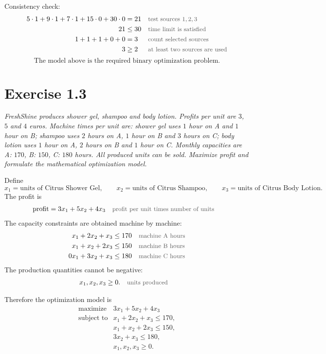 \documentclass[a4paper,11pt]{article}
\newif\ifexplain
\newcommand{\aufgabe}[1]{\section*{#1}}
\newcommand{\angabe}[1]{\textit{#1}\par\smallskip}
\newcommand{\why}[1]{\text{\small\color{black!65}#1}}
\newcommand{\explain}[1]{\ifexplain\begin{erklbox}#1\end{erklbox}\fi}
\begin{document}
Consistency check:
\begin{align*}
5\cdot1+9\cdot1+7\cdot1+15\cdot0+30\cdot0 &= 21 && \why{test sources $1,2,3$}\\
21&\le30 && \why{time limit is satisfied}\\
1+1+1+0+0&=3 && \why{count selected sources}\\
3&\ge2 && \why{at least two sources are used}
\end{align*}
\[
\boxed{\text{The model above is the required binary optimization problem.}}
\]

\aufgabe{Exercise 1.3}
\angabe{FreshShine produces shower gel, shampoo and body lotion. Profits per unit are $3$, $5$ and $4$ euros. Machine times per unit are: shower gel uses $1$ hour on A and $1$ hour on B; shampoo uses $2$ hours on A, $1$ hour on B and $3$ hours on C; body lotion uses $1$ hour on A, $2$ hours on B and $1$ hour on C. Monthly capacities are A: $170$, B: $150$, C: $180$ hours. All produced units can be sold. Maximize profit and formulate the mathematical optimization model.}
\explain{Hier dürfen Mengen kontinuierlich modelliert werden, weil die Aufgabe keine Ganzzahligkeit verlangt. Die Variablen zählen produzierte Einheiten der drei Produkte.}

Define
\[
x_1=\text{units of Citrus Shower Gel},\qquad
x_2=\text{units of Citrus Shampoo},\qquad
x_3=\text{units of Citrus Body Lotion}.
\]
The profit is
\begin{align*}
\text{profit} &= 3x_1+5x_2+4x_3 && \why{profit per unit times number of units}
\end{align*}
The capacity constraints are obtained machine by machine:
\begin{align*}
x_1+2x_2+x_3 &\le170 && \why{machine A hours}\\
x_1+x_2+2x_3 &\le150 && \why{machine B hours}\\
0x_1+3x_2+x_3 &\le180 && \why{machine C hours}
\end{align*}
The production quantities cannot be negative:
\begin{align*}
x_1,x_2,x_3&\ge0. && \why{units produced}
\end{align*}
\explain{In der C-Bedingung steht $0x_1$, weil Shower Gel keine Maschine C benötigt. Man kann den Term auch weglassen; hier bleibt er stehen, damit alle drei Produkte in jeder Zeile sichtbar sind.}

Therefore the optimization model is
\[
\boxed{
\begin{array}{ll}
\text{maximize} & 3x_1+5x_2+4x_3\\[2mm]
\text{subject to} & x_1+2x_2+x_3\le170,\\
& x_1+x_2+2x_3\le150,\\
& 3x_2+x_3\le180,\\
& x_1,x_2,x_3\ge0.
\end{array}}
\]
\end{document}
